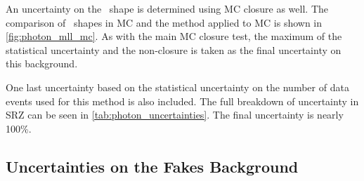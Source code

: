 An uncertainty on the \mll~shape is determined using \ac{MC} closure as well. The comparison of \mll~shapes in \dyjets \ac{MC} and the \gjets method applied to \ac{MC} is shown in \autoref{fig:photon_mll_mc}. As with the main \ac{MC} closure test, the maximum of the statistical uncertainty and the non-closure is taken as the final uncertainty on this background.

One last uncertainty based on the statistical uncertainty on the number of \gjets data events used for this method is also included. The full breakdown of uncertainty in SRZ can be seen in \autoref{tab:photon_uncertainties}. The final uncertainty is nearly 100\%.

\begin{table}[!hbt]
\centering
{}
\caption{Uncertainty breakdown for the \gjets method in SRZ. Uncertainties considered are the impact of \ac{MC} uncertainty on $V\gamma$ backgrounds, \ac{MC} closure, uncertainty on \mll~shape (also determined via \ac{MC} closure), reweighting uncertainties, smearing uncertainties, and statistical uncertainty on the \gjets events used in the method.}
\label{tab:photon_uncertainties}
\end{table}


\subsection{Uncertainties on the Fakes Background}
\label{sec:uncert_fakes}

